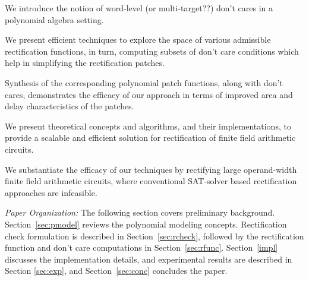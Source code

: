 \item We introduce the notion of word-level (or multi-target??) don't 
cares in a polynomial algebra setting.

\item We present efficient techniques to explore the space of various admissible rectification
functions, in turn, computing subsets of don't care conditions
which help in simplifying the rectification patches.
	\bi
	\item Synthesis of the corresponding polynomial patch functions, along with don't cares, demonstrates 
	the efficacy of our approach in terms of improved area and delay characteristics of the patches.
	\ei

\item We present theoretical concepts and algorithms, and their implementations, 
to provide a scalable and efficient solution for rectification of finite field arithmetic circuits.

\item We substantiate the efficacy of our techniques by rectifying 
large operand-width finite field arithmetic circuits, where conventional SAT-solver based 
rectification approaches are infeasible.

\ei


{\it Paper Organization:} The following section covers preliminary
background. Section~\ref{sec:pmodel} reviews the polynomial modeling
concepts. Rectification check formulation is described in
Section~\ref{sec:rcheck}, followed by the rectification function and
don't care computations in Section~\ref{sec:rfunc}. Section~\ref{impl}
discusses the implementation details, and experimental
results are described in Section \ref{sec:exp}, and
Section~\ref{sec:conc} concludes the paper. 